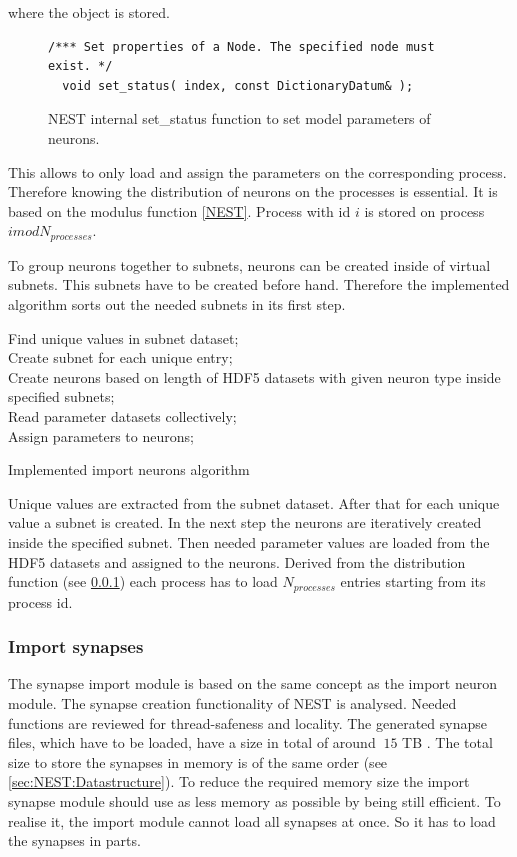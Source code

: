where the object is stored.
\begin{figure}[ht!]
\begin{lstlisting}[style=cppcode]
/*** Set properties of a Node. The specified node must exist. */
  void set_status( index, const DictionaryDatum& );
\end{lstlisting}
\caption{NEST internal set\_{}status function to set model parameters of neurons.}
\label{code:setstatus}
\end{figure}
This allows to only load and assign the parameters on the corresponding process.
Therefore knowing the distribution of neurons on the processes is essential.
It is based on the modulus function \ref{NEST}.
Process with id $i$ is stored on process $i mod N_{processes}$.

To group neurons together to subnets, neurons can be created inside of virtual subnets.
This subnets have to be created before hand.
Therefore the implemented algorithm sorts out the needed subnets in its first step.
\begin{algorithm}[ht!]
 Find unique values in subnet dataset; \\
 Create subnet for each unique entry; \\
 Create neurons based on length of HDF5 datasets with given neuron type inside specified subnets; \\
 Read parameter datasets collectively; \\
 Assign parameters to neurons;
\label{alg2}
\caption{Implemented import neurons algorithm}
\end{algorithm}
Unique values are extracted from the subnet dataset.
After that for each unique value a subnet is created.
In the next step the neurons are iteratively created inside the specified subnet.
Then needed parameter values are loaded from the HDF5 datasets and assigned to the neurons.
Derived from the distribution function (see \ref{}) each process has to load $N_{processes}$
entries starting from its process id.

\newpage
\subsubsection{Import synapses}
The synapse import module is based on the same concept as the import neuron module.
The synapse creation functionality of NEST is analysed.
Needed functions are reviewed for thread-safeness and locality.
The generated synapse files, which have to be loaded, have a size in total of around $~15$ TB .
The total size to store the synapses in memory is of the same order (see \ref{sec:NEST:Datastructure}).
To reduce the required memory size the import synapse module should use as less memory
as possible by being still efficient.
To realise it, the import module cannot load all synapses at once.
So it has to load the synapses in parts.


